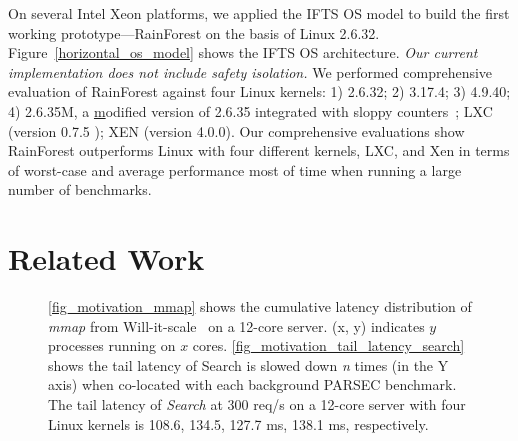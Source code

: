 \documentclass[pageno]{jpaper}
\begin{document}
On several Intel Xeon platforms, we applied the IFTS OS model to build the first working prototype---RainForest on the basis of Linux 2.6.32. Figure~\ref{horizontal_os_model} shows the IFTS OS architecture.
\emph{Our current implementation does not include safety isolation.}
We performed comprehensive evaluation of RainForest against four Linux kernels: 1) 2.6.32; 2) 3.17.4; 3) 4.9.40; 4) 2.6.35M,
a \underline{m}odified version of 2.6.35 integrated with sloppy counters~\cite{Boyd-Wickizer:2010:MOSBench}; LXC (version 0.7.5 ); XEN (version 4.0.0).  Our comprehensive evaluations show RainForest outperforms Linux with four different kernels, LXC, and Xen in terms of worst-case and average performance most of time when running a large number of benchmarks.
























































 \section{Related Work}




\begin{figure*}[t]
\setlength{\abovecaptionskip}{0pt}
\setlength{\belowcaptionskip}{3pt}
    \centering
    \caption{\ref{fig_motivation_mmap} shows the cumulative latency distribution of \emph{mmap} from Will-it-scale~\cite{Will-It-Scale} on a 12-core server. (x, y) indicates $y$ processes running on $x$ cores.
\ref{fig_motivation_tail_latency_search} shows the tail latency of Search is slowed down \emph{n} times (in the Y axis) when co-located with each background PARSEC benchmark. The tail latency of \emph{Search} at 300 req/s on a 12-core server with four Linux kernels  is 108.6, 134.5, 127.7 ms, 138.1 ms, respectively.}
    \label{fig_motivation_tail_latency}
\end{figure*}
\end{document}

